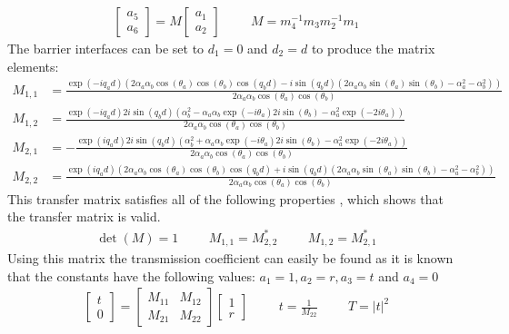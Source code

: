 \documentclass[12pt,a4paper]{report}
\begin{document}
			\begin{align}
				\left[\begin{array}{ccc}
					a_{5}\\
					a_{6}
				\end{array}\right]=M
				\left[\begin{array}{ccc}
					a_{1}\\
					a_{2}
				\end{array}\right]\hspace{1cm}
				M=m_{4}^{-1}m_{3}m_{2}^{-1}m_{1}
			\end{align}
			The barrier interfaces can be set to $d_{1}=0$ and $d_{2}=d$ to produce the matrix elements:
				\begin{align}
					M_{1,1}&=\frac{\exp(-iq_{a}d)\left(2\alpha_{a}\alpha_{b}\cos(\theta_{a})\cos(\theta_{b})\cos(q_{b}d)-i\sin(q_{b}d)\left(2\alpha_{a}\alpha_{b}\sin(\theta_{a})\sin(\theta_{b})-\alpha_{a}^{2}-\alpha_{b}^{2}\right)\right)}{2\alpha_{a}\alpha_{b}\cos(\theta_{a})\cos(\theta_{b})}\\
					M_{1,2}&=\frac{\exp(-iq_{a}d)2i\sin(q_{b}d)\left(\alpha_{b}^{2}-\alpha_{a}\alpha_{b}\exp(-i\theta_{a})2i\sin(\theta_{b})-\alpha_{a}^{2}\exp(-2i\theta_{a})\right)}{2\alpha_{a}\alpha_{b}\cos(\theta_{a})\cos(\theta_{b})}\\
					M_{2,1}&=-\frac{\exp(iq_{a}d)2i\sin(q_{b}d)\left(\alpha_{b}^{2}+\alpha_{a}\alpha_{b}\exp(-i\theta_{a})2i\sin(\theta_{b})-\alpha_{a}^{2}\exp(-2i\theta_{a})\right)}{2\alpha_{a}\alpha_{b}\cos(\theta_{a})\cos(\theta_{b})}\\
M_{2,2}&=\frac{\exp(iq_{a}d)\left(2\alpha_{a}\alpha_{b}\cos(\theta_{a})\cos(\theta_{b})\cos(q_{b}d)+i\sin(q_{b}d)\left(2\alpha_{a}\alpha_{b}\sin(\theta_{a})\sin(\theta_{b})-\alpha_{a}^{2}-\alpha_{b}^{2}\right)\right)}{2\alpha_{a}\alpha_{b}\cos(\theta_{a})\cos(\theta_{b})}
				\end{align}
				This transfer matrix satisfies all of the following properties \cite{b18}, which shows that the transfer matrix is valid.
				\begin{align}
					\det(M)=1\hspace{1cm}M_{1,1}=M_{2,2}^{*}\hspace{1cm}M_{1,2}=M_{2,1}^{*}
				\end{align}
				Using this matrix the transmission coefficient can easily be found as it is known that the constants have the following values: $a_{1}=1, a_{2}=r, a_{3}=t$ and $a_{4}=0$
				\begin{align}
					\left[\begin{array}{ccc}
						t\\
						0
					\end{array}\right]=
					\left[\begin{array}{ccc}
						M_{11}&M_{12}\\
						M_{21}&M_{22}
					\end{array}\right]
					\left[\begin{array}{ccc}
						1\\
						r
					\end{array}\right]\hspace{1cm}
					t=\frac{1}{M_{22}}\hspace{1cm}T=|t|^{2}
				\end{align}
\end{document}
